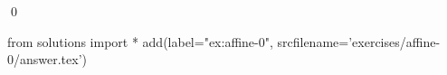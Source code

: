 
\begin{ex} 
  \label{ex:affine-0}
  
  \qed
\end{ex} 
\begin{python0}
from solutions import *
add(label="ex:affine-0",
    srcfilename='exercises/affine-0/answer.tex') 
\end{python0}
